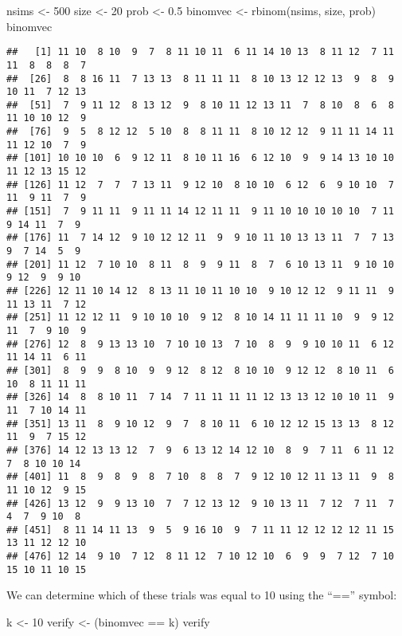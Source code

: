 \documentclass[
]{book}
\newenvironment{Shaded}{\begin{snugshade}}{\end{snugshade}}
\newcommand{\DecValTok}[1]{\textcolor[rgb]{0.00,0.00,0.81}{#1}}
\newcommand{\FloatTok}[1]{\textcolor[rgb]{0.00,0.00,0.81}{#1}}
\newcommand{\FunctionTok}[1]{\textcolor[rgb]{0.00,0.00,0.00}{#1}}
\newcommand{\NormalTok}[1]{#1}
\newcommand{\OtherTok}[1]{\textcolor[rgb]{0.56,0.35,0.01}{#1}}
\newcommand{\SpecialCharTok}[1]{\textcolor[rgb]{0.00,0.00,0.00}{#1}}
\begin{document}
\begin{Shaded}
\begin{Highlighting}[]
\NormalTok{nsims }\OtherTok{\textless{}{-}} \DecValTok{500}
\NormalTok{size }\OtherTok{\textless{}{-}} \DecValTok{20}
\NormalTok{prob }\OtherTok{\textless{}{-}} \FloatTok{0.5}
\NormalTok{binomvec }\OtherTok{\textless{}{-}} \FunctionTok{rbinom}\NormalTok{(nsims, size, prob)}
\NormalTok{binomvec}
\end{Highlighting}
\end{Shaded}

\begin{verbatim}
##   [1] 11 10  8 10  9  7  8 11 10 11  6 11 14 10 13  8 11 12  7 11 11  8  8  8  7
##  [26]  8  8 16 11  7 13 13  8 11 11 11  8 10 13 12 12 13  9  8  9 10 11  7 12 13
##  [51]  7  9 11 12  8 13 12  9  8 10 11 12 13 11  7  8 10  8  6  8 11 10 10 12  9
##  [76]  9  5  8 12 12  5 10  8  8 11 11  8 10 12 12  9 11 11 14 11 11 12 10  7  9
## [101] 10 10 10  6  9 12 11  8 10 11 16  6 12 10  9  9 14 13 10 10 11 12 13 15 12
## [126] 11 12  7  7  7 13 11  9 12 10  8 10 10  6 12  6  9 10 10  7 11  9 11  7  9
## [151]  7  9 11 11  9 11 11 14 12 11 11  9 11 10 10 10 10 10  7 11  9 14 11  7  9
## [176] 11  7 14 12  9 10 12 12 11  9  9 10 11 10 13 13 11  7  7 13  9  7 14  5  9
## [201] 11 12  7 10 10  8 11  8  9  9 11  8  7  6 10 13 11  9 10 10  9 12  9  9 10
## [226] 12 11 10 14 12  8 13 11 10 11 10 10  9 10 12 12  9 11 11  9 11 13 11  7 12
## [251] 11 12 12 11  9 10 10 10  9 12  8 10 14 11 11 11 10  9  9 12 11  7  9 10  9
## [276] 12  8  9 13 13 10  7 10 10 13  7 10  8  9  9 10 10 11  6 12 11 14 11  6 11
## [301]  8  9  9  8 10  9  9 12  8 12  8 10 10  9 12 12  8 10 11  6 10  8 11 11 11
## [326] 14  8  8 10 11  7 14  7 11 11 11 11 12 13 13 12 10 10 11  9 11  7 10 14 11
## [351] 13 11  8  9 10 12  9  7  8 10 11  6 10 12 12 15 13 13  8 12 11  9  7 15 12
## [376] 14 12 13 13 12  7  9  6 13 12 14 12 10  8  9  7 11  6 11 12  7  8 10 10 14
## [401] 11  8  9  8  9  8  7 10  8  8  7  9 12 10 12 11 13 11  9  8 11 10 12  9 15
## [426] 13 12  9  9 13 10  7  7 12 13 12  9 10 13 11  7 12  7 11  7  4  7  9 10  8
## [451]  8 11 14 11 13  9  5  9 16 10  9  7 11 11 12 12 12 12 11 15 13 11 12 12 10
## [476] 12 14  9 10  7 12  8 11 12  7 10 12 10  6  9  9  7 12  7 10 15 10 11 10 15
\end{verbatim}

We can determine which of these trials was equal to 10 using the ``=='' symbol:

\begin{Shaded}
\begin{Highlighting}[]
\NormalTok{k }\OtherTok{\textless{}{-}} \DecValTok{10}
\NormalTok{verify }\OtherTok{\textless{}{-}}\NormalTok{ (binomvec }\SpecialCharTok{==}\NormalTok{ k)}
\NormalTok{verify}
\end{Highlighting}
\end{Shaded}
\end{document}
